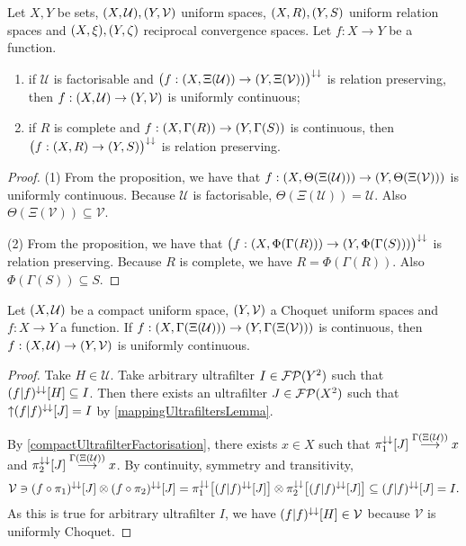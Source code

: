 \begin{corollary}
Let $X,Y$ be sets, $\sSet{X,\mathcal{U}}, \sSet{Y,\mathcal{V}}$ uniform spaces, $\sSet{X,R}, \sSet{Y,S}$ uniform relation spaces and $\sSet{X,\xi}, \sSet{Y,\zeta}$ reciprocal convergence spaces. Let $f: X\to Y$ be a function.
\begin{enumerate}
\item if $\mathcal{U}$ is factorisable and $\big(f: \sSet{X,\Xi(\mathcal{U})} \to \sSet{Y,\Xi(\mathcal{V})}\big)^{\imf\imf}$ is relation preserving, then $f: \sSet{X,\mathcal{U}} \to \sSet{Y,\mathcal{V}}$ is uniformly continuous;
\item if $R$ is complete and $f: \sSet{X,\Gamma(R)} \to \sSet{Y,\Gamma(S)}$ is continuous, then $\big(f: \sSet{X,R} \to \sSet{Y,S}\big)^{\imf\imf}$ is relation preserving.
\end{enumerate}
\end{corollary}
\begin{proof}
(1) From the proposition, we have that $f: \sSet{X,\Theta(\Xi(\mathcal{U}))} \to \sSet{Y,\Theta(\Xi(\mathcal{V}))}$ is uniformly continuous. Because $\mathcal{U}$ is factorisable, $\Theta(\Xi(\mathcal{U})) = \mathcal{U}$. Also $\Theta(\Xi(\mathcal{V})) \subseteq \mathcal{V}$.

(2) From the proposition, we have that $\big(f: \sSet{X,\Phi(\Gamma(R))} \to \sSet{Y,\Phi(\Gamma(S))}\big)^{\imf\imf}$ is relation preserving. Because $R$ is complete, we have $R = \Phi(\Gamma(R))$. Also $\Phi(\Gamma(S)) \subseteq S$.
\end{proof}

\begin{theorem} \label{HeineCantorTheorem}
Let $\sSet{X,\mathcal{U}}$ be a compact uniform space, $\sSet{Y,\mathcal{V}}$ a Choquet uniform spaces and $f: X\to Y$ a function. If $f: \sSet{X,\Gamma(\Xi(\mathcal{U}))} \to \sSet{Y,\Gamma(\Xi(\mathcal{V}))}$ is continuous, then $f: \sSet{X,\mathcal{U}} \to \sSet{Y,\mathcal{V}}$ is uniformly continuous.
\end{theorem}
\begin{proof}
Take $H\in\mathcal{U}$. Take arbitrary ultrafilter $I\in\operatorname{\mathcal{FP}}(Y^2)$ such that $(f|f)^{\downarrow\downarrow}[H]\subseteq I$. Then there exists an ultrafilter $J\in \operatorname{\mathcal{FP}}(X^2)$ such that $\operatorname{\uparrow} (f|f)^{\downarrow\downarrow}[J] = I$ by \ref{mappingUltrafiltersLemma}.

By \ref{compactUltrafilterFactorisation}, there exists $x\in X$ such that $\pi_1^{\downarrow\downarrow}[J]\overset{\Gamma(\Xi(\mathcal{U}))}{\longrightarrow} x$ and $\pi_2^{\downarrow\downarrow}[J]\overset{\Gamma(\Xi(\mathcal{U}))}{\longrightarrow} x$. By continuity, symmetry and transitivity,
\[ \mathcal{V} \ni (f\circ \pi_1)^{\downarrow\downarrow}[J]\otimes (f\circ \pi_2)^{\downarrow\downarrow}[J] = \pi_1^{\downarrow\downarrow}\big[(f|f)^{\downarrow\downarrow}[J]\big]\otimes \pi_2^{\downarrow\downarrow}\big[(f|f)^{\downarrow\downarrow}[J]\big] \subseteq (f|f)^{\downarrow\downarrow}[J] = I. \]
As this is true for arbitrary ultrafilter $I$, we have $(f|f)^{\downarrow\downarrow}[H]\in\mathcal{V}$ because $\mathcal{V}$ is uniformly Choquet.
\end{proof}


